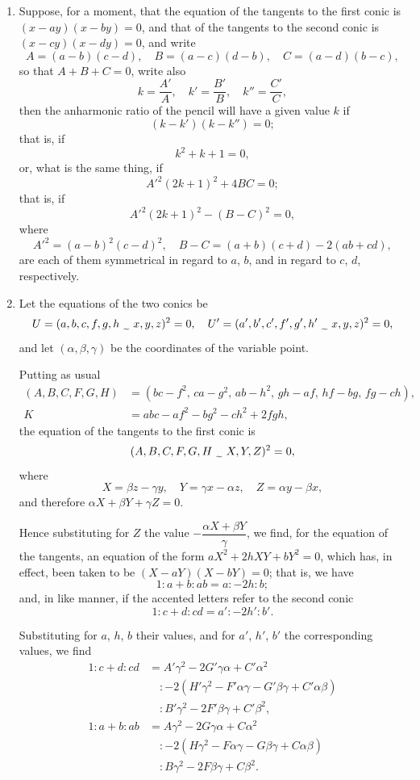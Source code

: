 \documentclass[12pt,a4paper]{article}
\theoremstyle{plain}
\theoremstyle{definition}
\theoremstyle{remark}
\begin{document}
\begin{enumerate}[label=\arabic*.]
\item Suppose, for a moment, that the equation of the tangents to the first conic is $(x - ay)(x - by) = 0$, and that of the tangents to the second conic is $(x - cy)(x - dy) = 0$, and write
\[A = (a-b)(c-d), \quad B = (a-c)(d-b), \quad C = (a-d)(b-c),\]
so that $A + B + C = 0$, write also
\[k = \frac{A'}{A}, \quad k' = \frac{B'}{B}, \quad k'' = \frac{C'}{C},\]
then the anharmonic ratio of the pencil will have a given value $k$ if
\[(k - k')(k - k'') = 0;\]
that is, if
\[k^2 + k + 1 = 0,\]
or, what is the same thing, if
\[A'^2 (2k+1)^2 + 4BC = 0;\]
that is, if
\[A'^2 (2k+1)^2 - (B-C)^2 = 0,\]
where
\[A'^2 = (a-b)^2(c-d)^2, \quad B-C = (a+b)(c+d) - 2(ab+cd),\]
are each of them symmetrical in regard to $a$, $b$, and in regard to $c$, $d$, respectively.

\item Let the equations of the two conics be
\[U = (a,b,c,f,g,h \,\raisebox{-0.5ex}{\,\texttildelow\,}\, x,y,z)^2 = 0, \quad U' = (a',b',c',f',g',h' \,\raisebox{-0.5ex}{\,\texttildelow\,}\, x,y,z)^2 = 0,\]
and let $(\alpha, \beta, \gamma)$ be the coordinates of the variable point.

Putting as usual
\begin{align*}
(A,B,C,F,G,H) &= (bc-f^2,\, ca-g^2,\, ab-h^2,\, gh-af,\, hf-bg,\, fg-ch), \\
K &= abc - af^2 - bg^2 - ch^2 + 2fgh,
\end{align*}
the equation of the tangents to the first conic is
\[(A,B,C,F,G,H \,\raisebox{-0.5ex}{\,\texttildelow\,}\, X,Y,Z)^2 = 0,\]
where
\[X = \beta z - \gamma y, \quad Y = \gamma x - \alpha z, \quad Z = \alpha y - \beta x,\]
and therefore $\alpha X + \beta Y + \gamma Z = 0$.

Hence substituting for $Z$ the value $-\dfrac{\alpha X + \beta Y}{\gamma}$, we find, for the equation of the tangents, an equation of the form $aX^2 + 2hXY + bY^2 = 0$, which has, in effect, been taken to be $(X - aY)(X - bY) = 0$; that is, we have
\[1 : a+b : ab = a : -2h : b;\]
and, in like manner, if the accented letters refer to the second conic
\[1 : c+d : cd = a' : -2h' : b'.\]

Substituting for $a$, $h$, $b$ their values, and for $a'$, $h'$, $b'$ the corresponding values, we find
\begin{align*}
1 : c+d : cd &= A'\gamma^2 - 2G'\gamma\alpha + C'\alpha^2 \\
&\quad : -2(H'\gamma^2 - F'\alpha\gamma - G'\beta\gamma + C'\alpha\beta) \\
&\quad : B'\gamma^2 - 2F'\beta\gamma + C'\beta^2, \\
1 : a+b : ab &= A\gamma^2 - 2G\gamma\alpha + C\alpha^2 \\
&\quad : -2(H\gamma^2 - F\alpha\gamma - G\beta\gamma + C\alpha\beta) \\
&\quad : B\gamma^2 - 2F\beta\gamma + C\beta^2.
\end{align*}


\end{enumerate}
\end{document}
